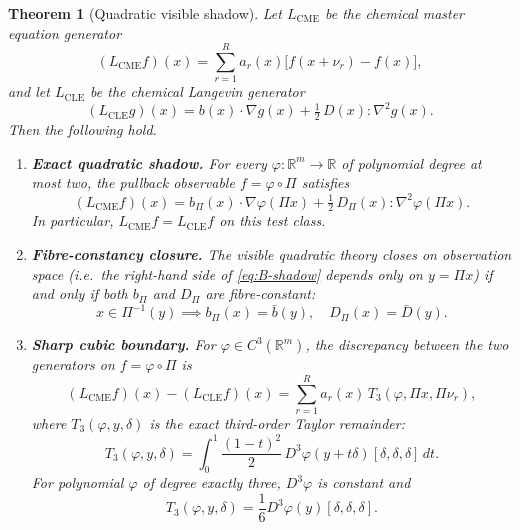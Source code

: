 \documentclass[11pt,a4paper]{article}
\numberwithin{equation}{section}
\newcommand{\R}{\mathbb{R}}
\theoremstyle{thmcompact}
\newtheorem{theorem}{Theorem}[section]
\theoremstyle{remark}
\begin{document}
\begin{theorem}[Quadratic visible shadow]\label{thm:bridge-B}
Let $L_{\mathrm{CME}}$ be the chemical master equation generator
\[
(L_{\mathrm{CME}} f)(x) = \sum_{r=1}^R a_r(x)\bigl[f(x + \nu_r) - f(x)\bigr],
\]
and let $L_{\mathrm{CLE}}$ be the chemical Langevin generator
\[
(L_{\mathrm{CLE}} g)(x) = b(x) \cdot \nabla g(x) + \tfrac{1}{2}\, D(x) : \nabla^2 g(x).
\]
Then the following hold.
\begin{enumerate}[label=\textup{(\roman*)}]
\item \textbf{Exact quadratic shadow.} For every $\varphi: \R^m \to \R$ of polynomial degree at most two, the pullback observable $f = \varphi \circ \Pi$ satisfies
\begin{equation}\label{eq:B-shadow}
(L_{\mathrm{CME}} f)(x) = b_\Pi(x) \cdot \nabla\varphi(\Pi x) + \tfrac{1}{2}\, D_\Pi(x) : \nabla^2 \varphi(\Pi x).
\end{equation}
In particular, $L_{\mathrm{CME}} f = L_{\mathrm{CLE}} f$ on this test class.

\item \textbf{Fibre-constancy closure.} The visible quadratic theory closes on observation space (i.e.\ the right-hand side of \eqref{eq:B-shadow} depends only on $y = \Pi x$) if and only if both $b_\Pi$ and $D_\Pi$ are fibre-constant:
\begin{equation}\label{eq:B-fibre}
x \in \Pi^{-1}(y) \implies b_\Pi(x) = \bar{b}(y), \quad D_\Pi(x) = \bar{D}(y).
\end{equation}

\item \textbf{Sharp cubic boundary.} For $\varphi \in C^3(\R^m)$, the discrepancy between the two generators on $f = \varphi \circ \Pi$ is
\begin{equation}\label{eq:B-cubic}
(L_{\mathrm{CME}} f)(x) - (L_{\mathrm{CLE}} f)(x) = \sum_{r=1}^R a_r(x)\, T_3(\varphi, \Pi x, \Pi\nu_r),
\end{equation}
where $T_3(\varphi, y, \delta)$ is the exact third-order Taylor remainder:
\begin{equation}\label{eq:B-taylor}
T_3(\varphi, y, \delta) = \int_0^1 \frac{(1-t)^2}{2}\, D^3\varphi(y+t\delta)[\delta,\delta,\delta] \, dt.
\end{equation}
For polynomial $\varphi$ of degree exactly three, $D^3\varphi$ is constant and
\[
T_3(\varphi, y, \delta) = \frac{1}{6}D^3\varphi(y)[\delta,\delta,\delta].
\]
\end{enumerate}
\end{theorem}
\end{document}
